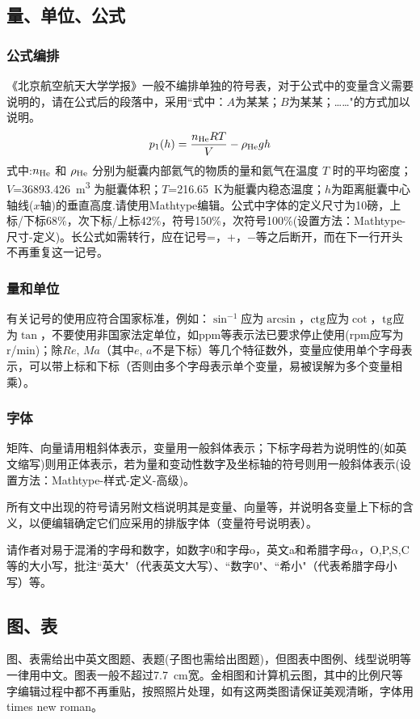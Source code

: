 \documentclass[10.5pt,twocolumn]{aaas}
\begin{document}
\subsection{量、单位、公式}
\subsubsection{公式编排}
\label{labSecForm}
《北京航空航天大学学报》一般不编排单独的符号表，对于公式中的变量含义需要说明的，请在公式后的段落中，采用``式中：$A$为某某；$B$为某某；……"的方式加以说明。
\begin{equation}
\label{eqnLabelp}
p_1 (h) = \dfrac{n_{\textnormal{He}}RT}{V}-\rho_{\textnormal{He}}gh
\end{equation}
式中:$n_{\textnormal{He}}$ 和 $\rho_{\textnormal{He}}$ 分别为艇囊内部氦气的物质的量和氦气在温度 $T$ 时的平均密度；
$V$=\SI{36893.426}{\cubic\meter}%
为艇囊体积；$T$=\SI{216.65}{\kelvin}为艇囊内稳态温度；$h$为距离艇囊中心轴线($x$轴)的垂直高度.请使用Mathtype编辑。公式中字体的定义尺寸为10磅，上标/下标68\%，次下标/上标42\%，符号150\%，次符号100\%(设置方法：Mathtype-尺寸-定义)。长公式如需转行，应在记号=，+，$-$等之后断开，而在下一行开头不再重复这一记号。

\subsubsection{量和单位}
有关记号的使用应符合国家标准，例如：$\sin^{-1}$应为$\arcsin$，$\rm ctg$应为$\cot$，$\rm tg$应为$\tan$，不要使用非国家法定单位，如ppm等表示法已要求停止使用(rpm应写为r/min)；除$Re$, $Ma$（其中$e$, $a$不是下标）等几个特征数外，变量应使用单个字母表示，可以带上标和下标（否则由多个字母表示单个变量，易被误解为多个变量相乘）。

\subsubsection{字体}
矩阵、向量请用粗斜体表示，变量用一般斜体表示；下标字母若为说明性的(如英文缩写)则用正体表示，若为量和变动性数字及坐标轴的符号则用一般斜体表示(设置方法：Mathtype-样式-定义-高级)。

所有文中出现的符号请另附文档说明其是变量、向量等，并说明各变量上下标的含义，以便编辑确定它们应采用的排版字体（变量符号说明表）。

请作者对易于混淆的字母和数字，如数字0和字母o，英文a和希腊字母$\alpha$，O,P,S,C等的大小写，批注``英大"（代表英文大写）、``数字0"、``希小"（代表希腊字母小写）等。

\subsection{图、表}
图、表需给出中英文图题、表题(子图也需给出图题)，但图表中图例、线型说明等一律用中文。图表一般不超过7.7\ cm宽。金相图和计算机云图，其中的比例尺等字编辑过程中都不再重贴，按照照片处理，如有这两类图请保证美观清晰，字体用times new roman。
\end{document}
